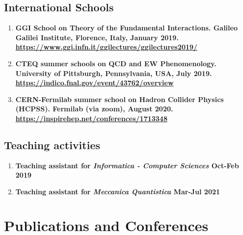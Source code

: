 \documentclass[12pt]{article}
\begin{document}
\subsection{International Schools}

\begin{enumerate}{\leftmargin 15pt \itemsep 0pt \topsep 3pt}
	\item{\bf GGI School on Theory of the Fundamental Interactions. Galileo Galilei Institute, Florence, Italy, January 2019. \\ \href{https://www.ggi.infn.it/ggilectures/ggilectures2019/}{https://www.ggi.infn.it/ggilectures/ggilectures2019/}}
	\item{\bf CTEQ summer schools on QCD and EW Phenomenology. University of Pittsburgh, Pennsylvania, USA, July 2019. \\ \href{https://indico.fnal.gov/event/43762/overview}{https://indico.fnal.gov/event/43762/overview}}
	\item{\bf CERN-Fermilab summer school on Hadron Collider Physics (HCPSS). Fermilab (via zoom), August 2020. \\ \href{https://inspirehep.net/conferences/1713348}{https://inspirehep.net/conferences/1713348}}
\end{enumerate}

\subsection{Teaching activities}

\begin{enumerate}{\leftmargin 15pt \itemsep 0pt \topsep 3pt}
	\item{\bf Teaching assistant for \textit{Informatica - Computer Sciences} \hspace{1cm} Oct-Feb 2019}
	\item{\bf Teaching assistant for \textit{Meccanica Quantistica} \hspace{3.5cm} Mar-Jul 2021}
\end{enumerate}

\section{Publications and Conferences}
\end{document}
